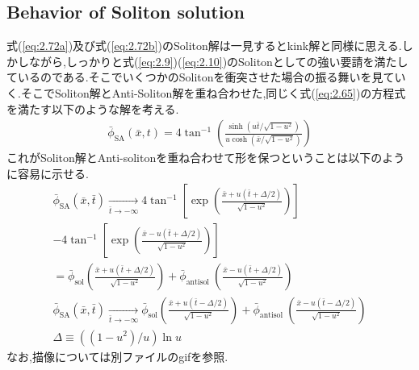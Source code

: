 \documentclass[dvipdfmx,11pt,a4paper,oneside,openany]{jsbook}
\begin{document}
\subsection{Behavior of Soliton solution}
式(\ref{eq:2.72a})及び式(\ref{eq:2.72b})のSoliton解は一見するとkink解と同様に思える.しかしながら,しっかりと式(\ref{eq:2.9})(\ref{eq:2.10})のSolitonとしての強い要請を満たしているのである.そこでいくつかのSolitonを衝突させた場合の振る舞いを見ていく.そこでSoliton解とAnti-Soliton解を重ね合わせた,同じく式(\ref{eq:2.65})の方程式を満たす以下のような解を考える.
\begin{align}
    \bar{\phi}_{\mathrm{SA}}(\bar{x}, t)=4 \tan ^{-1}\left(\frac{\sinh \left(u \bar{t} / \sqrt{1-u^{2}}\right)}{u \cosh \left(\bar{x} / \sqrt{1-u^{2}}\right)}\right)
\end{align}
これがSoliton解とAnti-solitonを重ね合わせて形を保つということは以下のように容易に示せる.
\begin{align}
    \bar{\phi}_{\mathrm{SA}}(\bar{x}, \bar{t}) \underset{\bar{t} \rightarrow-\infty}{\longrightarrow} 4 \tan ^{-1}\left[\exp \left(\frac{\bar{x}+u(\bar{t}+\Delta / 2)}{\sqrt{1-u^{2}}}\right)\right]\nonumber                                                                                  \\
    -4 \tan ^{-1}\left[\exp \left(\frac{\bar{x}-u(\bar{t}+\Delta / 2)}{\sqrt{1-u^{2}}}\right)\right]\nonumber                                                                                                                                                                                   \\
    =\bar{\phi}_{\mathrm{sol}}\left(\frac{\bar{x}+u(\bar{t}+\Delta / 2)}{\sqrt{1-u^{2}}}\right)+\bar{\phi}_{\text {antisol }}\left(\frac{\bar{x}-u(\bar{t}+\Delta / 2)}{\sqrt{1-u^{2}}}\right)                                                                                                  \\
    \bar{\phi}_{\mathrm{SA}}(\bar{x}, \bar{t}) \underset{\bar{t} \rightarrow-\infty}{\longrightarrow} \bar{\phi}_{\mathrm{sol}}\left(\frac{\bar{x}+u(\bar{t}-\Delta / 2)}{\sqrt{1-u^{2}}}\right)+\bar{\phi}_{\text {antisol }}\left(\frac{\bar{x}-u(\bar{t}-\Delta / 2)}{\sqrt{1-u^{2}}}\right) \\
    \Delta \equiv\left(\left(1-u^{2}\right) / u\right) \ln u
\end{align}
なお,描像については別ファイルのgifを参照.

\appendix
\end{document}
